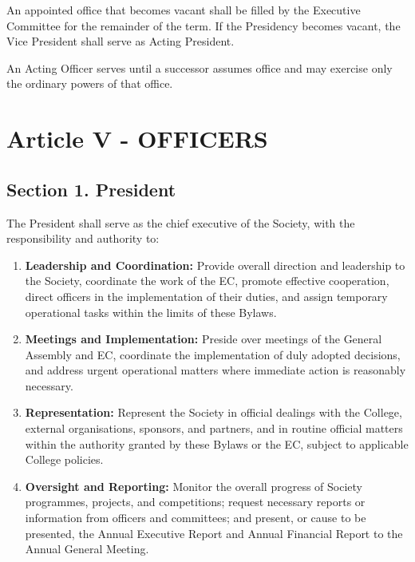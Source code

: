 \documentclass[a4paper]{article}
\begin{document}
An appointed office that becomes vacant shall be filled by the Executive Committee for the remainder of the term. If the Presidency becomes vacant, the Vice President shall serve as Acting President.

An Acting Officer serves until a successor assumes office and may exercise only the ordinary powers of that office.

\section*{Article V - OFFICERS}

\subsection*{Section 1. President}
The President shall serve as the chief executive of the Society, with the responsibility and authority to:
\begin{enumerate}
  \item \textbf{Leadership and Coordination:} Provide overall direction and leadership to the Society, coordinate the work of the EC, promote effective cooperation, direct officers in the implementation of their duties, and assign temporary operational tasks within the limits of these Bylaws.
  \item \textbf{Meetings and Implementation:} Preside over meetings of the General Assembly and EC, coordinate the implementation of duly adopted decisions, and address urgent operational matters where immediate action is reasonably necessary.
  \item \textbf{Representation:} Represent the Society in official dealings with the College, external organisations, sponsors, and partners, and in routine official matters within the authority granted by these Bylaws or the EC, subject to applicable College policies.
  \item \textbf{Oversight and Reporting:} Monitor the overall progress of Society programmes, projects, and competitions; request necessary reports or information from officers and committees; and present, or cause to be presented, the Annual Executive Report and Annual Financial Report to the Annual General Meeting.
\end{enumerate}
\end{document}
